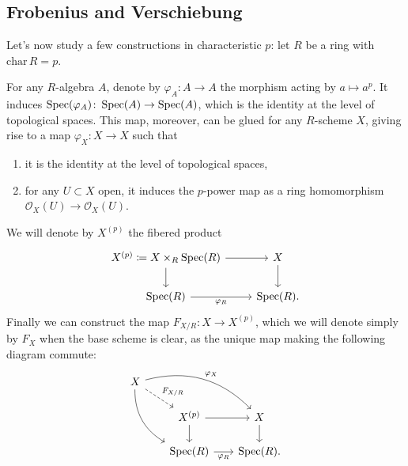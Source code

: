 \subsection{Frobenius and Verschiebung}\label{sec:FrobeniusVerschiebung}
Let's now study a few constructions in characteristic $p$:
let $R$ be a ring with $\mathrm{char}\, R = p$.


\begin{defn}[]
	For any $R$-algebra $A$,
	denote by $\varphi_A\colon A \to A$ the morphism
	acting by $a \mapsto a^p$.
	It induces $\operatorname{Spec}(\varphi_A)\colon \operatorname{Spec}(A) \to \operatorname{Spec}(A)$,
	which is the identity at the level of topological spaces.
	This map, moreover, can be glued for any $R$-scheme $X$, giving rise to a map
	$\varphi_X\colon X \to X$ such that
\begin{enumerate}
	\item it is the identity at the level of topological spaces,
	\item for any $U \subset X$ open, it induces the $p$-power map
		as a ring homomorphism $\mathcal{O}_{X}(U) \to \mathcal{O}_{ X }(U)$.
\end{enumerate}
	We will denote by $X^{(p)}$ the fibered product
	\begin{equation*}
	\begin{tikzcd}
		X^{(p)} \coloneqq X \times_{ R } \spec(R) \arrow[r, "", rightarrow] 
		\arrow[d, "", rightarrow] &
		X \arrow[d, "", rightarrow] \\
		\spec(R) \arrow[r, "\varphi_R"', rightarrow] &
		\spec(R)
	.\end{tikzcd}
	\end{equation*}
	Finally we can construct the map $F_{X/R} \colon X \to X^{(p)}$,
	which we will denote simply by $F_X$ when the base scheme is clear,
	as the unique map making the following diagram commute:
	\begin{equation*}
	\begin{tikzcd}[row sep=1.6em, column sep=1.8em]
		X \arrow[rrd, "\varphi_X", rightarrow, bend left] 
		\arrow[rdd, "", rightarrow, bend right, end anchor=north west]
		\arrow[rd, "F_{X/R}", dashrightarrow] & & \\
		&
		X^{(p)} \arrow[r, "", rightarrow] 
		\arrow[d, "", rightarrow] &
		X \arrow[d, "", rightarrow] \\
		&
		\spec(R) \arrow[r, "\varphi_R"', rightarrow] &
		\spec(R)
	.\end{tikzcd}
	\end{equation*}
\end{defn}



